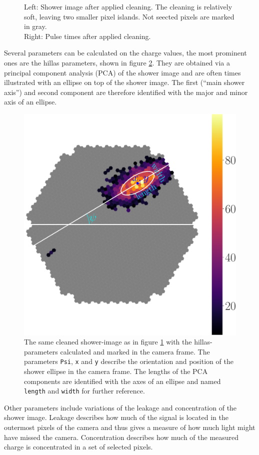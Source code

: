 \begin{figure}
\begin{subfigure}{.45\textwidth}
	\end{subfigure}
	\caption{
		Left: Shower image after applied cleaning. The cleaning is relatively soft,
        leaving two smaller pixel islands. Not seected pixels are marked in gray.\\ 
		Right: Pulse times after applied cleaning.}
	\label{fig:shower_cleaning}
\end{figure}

Several parameters can be calculated on the charge values, the most prominent ones are the 
hillas parameters, shown in figure \ref{fig:hillas_params}.
They are obtained via a principal component analysis (PCA) of the shower image
and are often times illustrated with an ellipse on top of the shower image.
The first (\enquote{main shower axis}) and second component are therefore
identified with the major and minor axis of an ellipse.

\begin{figure}
	\centering	
	\captionsetup{width=0.9\linewidth}
	\includegraphics[width=.6\textwidth]{Plots/hillas_cleaned_params.pdf}
	\caption{The same cleaned shower-image as in figure \ref{fig:shower_cleaning}
	with the hillas-parameters calculated and marked in the camera frame.
	The parameters \texttt{Psi}, \texttt{x} and \texttt{y} describe the 
	orientation and position of the shower ellipse in the camera frame.
    The lengths of the PCA components are identified with the axes of
    an ellipse and named \texttt{length} and \texttt{width} for further
    reference.}
	\label{fig:hillas_params}
\end{figure}

Other parameters include variations of the leakage and concentration of the shower image.
Leakage describes how much of the signal is located in the outermost pixels of the camera
and thus gives a measure of how much light might have missed the camera.
Concentration describes how much of the measured charge is concentrated in a set of selected pixels.

